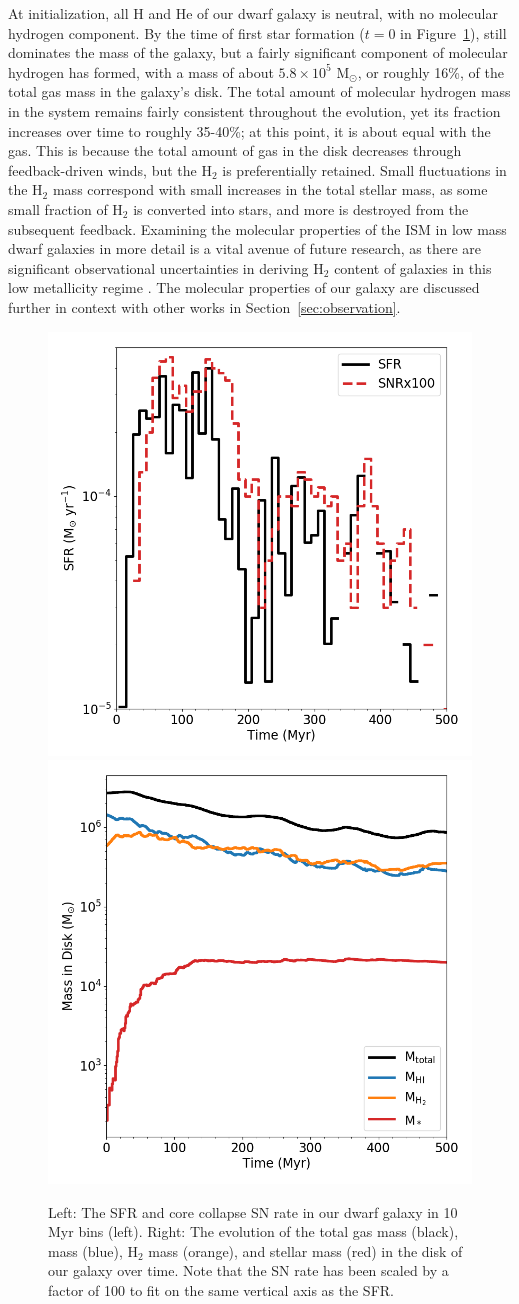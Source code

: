 \documentclass[twocolumn]{aastex61}
\begin{document}
At initialization, all H and He of our dwarf galaxy is neutral, with no molecular hydrogen component. By the time of first star formation ($t=0$ in Figure~\ref{fig:sfr_mass_evolution}),  still dominates the mass of the galaxy, but a fairly significant component of molecular hydrogen has formed, with a mass of about $5.8 \times 10^5$ M$_{\odot}$, or roughly 16\%, of the total gas mass in the galaxy's disk. The total amount of molecular hydrogen mass in the system remains fairly consistent throughout the evolution, yet its fraction increases over time to roughly 35-40\%; at this point, it is about equal with the  gas. This is because the total amount of gas in the disk decreases through feedback-driven winds, but the H$_2$ is preferentially retained. Small fluctuations in the H$_2$ mass correspond with small increases in the total stellar mass, as some small fraction of H$_2$ is converted into stars, and more is destroyed from the subsequent feedback. Examining the molecular properties of the ISM in low mass dwarf galaxies in more detail is a vital avenue of future research, as there are significant observational uncertainties in deriving H$_2$ content of galaxies in this low metallicity regime \citep{Leroy2008,McQuinn2012,Amorin2016}. The molecular properties of our galaxy are discussed further in context with other works in Section~\ref{sec:observation}. 

\begin{figure}
\centering
\includegraphics[width=0.475\linewidth]{sfr_snrx100}
\includegraphics[width=0.475\linewidth]{mass_evolution}
\caption{Left: The SFR and core collapse SN rate in our dwarf galaxy in 10 Myr bins (left). Right: The evolution of the total gas mass (black),  mass (blue), H$_2$ mass (orange), and stellar mass (red) in the disk of our galaxy over time. Note that the SN rate has been scaled by a factor of 100 to fit on the same vertical axis as the SFR.}
\label{fig:sfr_mass_evolution}
\end{figure}
\end{document}
